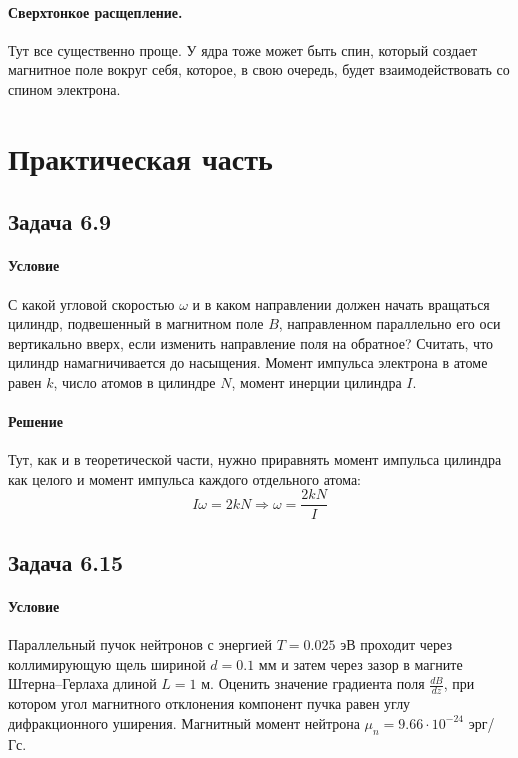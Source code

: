 \documentclass[12pt]{article}
\begin{document}
\paragraph{Сверхтонкое расщепление.}
Тут все существенно проще. У ядра тоже может быть спин, который создает магнитное поле вокруг себя, которое, в свою очередь, будет взаимодействовать со спином электрона.


\section{Практическая часть}
\subsection{Задача 6.9}
\label{task_6.9}
\paragraph{Условие}
С какой угловой скоростью $\omega$ и в каком направлении должен начать вращаться цилиндр, подвешенный в магнитном поле $B$, направленном параллельно его оси вертикально вверх, если изменить направление поля на обратное? Считать, что цилиндр намагничивается до насыщения. Момент импульса электрона в атоме равен $k$, число атомов в
цилиндре $N$, момент инерции цилиндра $I$.
\paragraph{Решение}
Тут, как и в теоретической части, нужно приравнять момент импульса цилиндра как целого и момент импульса каждого отдельного атома:
\begin{equation*}
    I\omega = 2kN \Rightarrow \omega = \dfrac{2kN}{I}
\end{equation*}

\subsection{Задача 6.15}
\label{task_6.15}
\paragraph{Условие}
Параллельный пучок нейтронов с энергией $T = 0.025$ эВ проходит через коллимирующую щель шириной $d = 0.1$ мм и затем через зазор в магните Штерна–Герлаха длиной $L = 1$ м. Оценить значение градиента поля $\frac{dB}{dz}$, при котором угол магнитного отклонения компонент пучка равен углу дифракционного уширения. Магнитный момент нейтрона $\mu_n = 9.66 \cdot 10^{-24}$ эрг/Гс.
\end{document}
